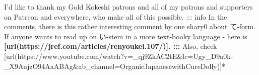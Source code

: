 I'd like to thank my Gold Kokeshi patrons and all of my patrons and supporters on Patreon and everywhere, who make all of this possible. ::: info In the comments, there is this rather interesting comment by one shary0 about て-form.\crlf
If anyone wants to read up on い-stem in a more text-booky language - here is {\bf {}[url(https://jref.com/articles/renyoukei.107/)].\crlf
::: }Also, check [url(https://www.youtube.com/watch?v=_qj9ZkAC2tE&lc=Ugy_D9a0k-_X9AujzO94AaABAg&ab_channel=OrganicJapanesewithCureDolly)]*

{}

\stopsectionlevel

\stopsectionlevel

